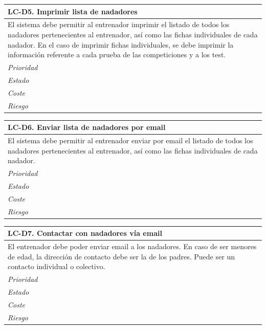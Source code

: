 	\begin{center}
		\begin{tabularx}{15cm}{|X|}
			\hline 
				\bf{LC-D5. Imprimir lista de nadadores}\\
			\hline
				El sistema debe permitir al entrenador imprimir el listado de todos los nadadores pertenecientes al entrenador, así como las fichas individuales de cada nadador. En el caso de imprimir fichas individuales, se debe imprimir la información referente a cada prueba de las competiciones y a los test.\\
			\hline
				\it{Prioridad}\\
			\hline
				\it{Estado}\\
			\hline
				\it{Coste}\\
			\hline
				\it{Riesgo}\\
			\hline
		\end{tabularx}
	\end{center}
	
	\begin{center}
		\begin{tabularx}{15cm}{|X|}
			\hline 
				\bf{LC-D6. Enviar lista de nadadores por email}\\
			\hline
				El sistema debe permitir al entrenador enviar por email el listado de todos los nadadores pertenecientes al entrenador, así como las fichas individuales de cada nadador.\\
			\hline
				\it{Prioridad}\\
			\hline
				\it{Estado}\\
			\hline
				\it{Coste}\\
			\hline
				\it{Riesgo}\\
			\hline
		\end{tabularx}
	\end{center}
	
	\begin{center}
		\begin{tabularx}{15cm}{|X|}
			\hline 
				\bf{LC-D7. Contactar con nadadores vía email}\\
			\hline
				El entrenador debe poder enviar email a los nadadores. En caso de ser menores de edad, la dirección de contacto debe ser la de los padres. Puede ser un contacto individual o colectivo.\\
			\hline
				\it{Prioridad}\\
			\hline
				\it{Estado}\\
			\hline
				\it{Coste}\\
			\hline
				\it{Riesgo}\\
			\hline
		\end{tabularx}
	\end{center}
	
